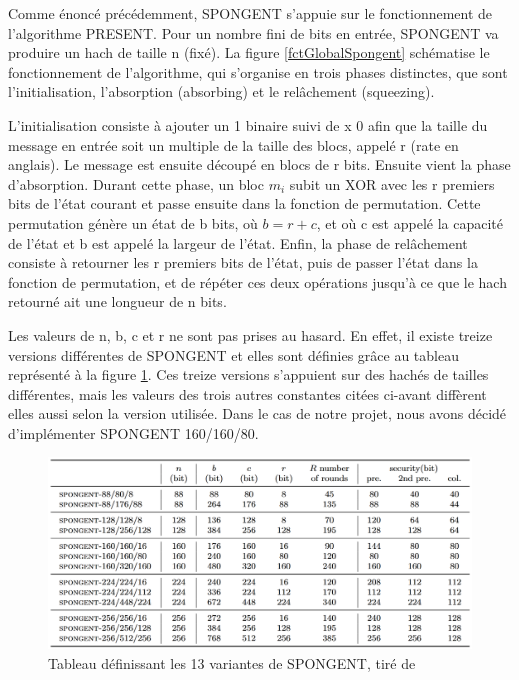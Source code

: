 Comme énoncé précédemment, SPONGENT s'appuie sur le fonctionnement de
l'algorithme PRESENT. Pour un nombre fini de bits en entrée, SPONGENT va
produire un hach de taille n (fixé). La figure \ref{fctGlobalSpongent}
schématise le fonctionnement de l'algorithme, qui s'organise en trois
phases distinctes, que sont l'initialisation, l'absorption (absorbing) et
le relâchement (squeezing).

L'initialisation consiste à ajouter un 1 binaire suivi de x 0 afin que la
taille du message en entrée soit un multiple de la taille des blocs, appelé
r (rate en anglais). Le message est ensuite découpé en blocs de r bits.
Ensuite vient la phase d'absorption. Durant cette phase, un bloc $m_{i}$
subit un XOR avec les r premiers bits de l'état courant et passe ensuite
dans la fonction de permutation. Cette permutation génère un état de b
bits, où $b = r + c$, et où c est appelé la capacité de l'état et b est
appelé la largeur de l'état. Enfin, la phase de relâchement consiste à
retourner les r premiers bits de l'état, puis de passer l'état dans la
fonction de permutation, et de répéter ces deux opérations jusqu'à ce que
le hach retourné ait une longueur de n bits.

Les valeurs de n, b, c et r ne sont pas prises au hasard. En effet, il
existe treize versions différentes de SPONGENT et elles sont définies grâce
au tableau représenté à la figure \ref{variantesSpongent}. Ces treize
versions s'appuient sur des hachés de tailles différentes, mais les valeurs
des trois autres constantes citées ci-avant diffèrent elles aussi selon la
version utilisée. Dans le cas de notre projet, nous avons décidé
d'implémenter SPONGENT 160/160/80.

\begin{figure}[!h]
	\centering
	\includegraphics[width=\textwidth]{imgs/Spongent/varianteSpongent.png}
	\caption{Tableau définissant  les 13 variantes de SPONGENT, tiré de \cite{6275435}}
	\label{variantesSpongent}
\end{figure}

